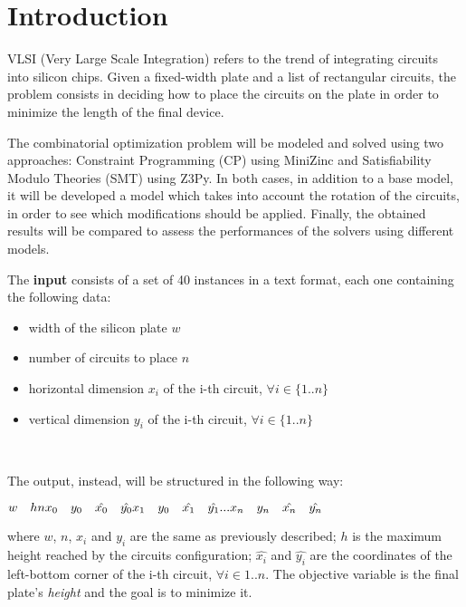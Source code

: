 \section{Introduction}

VLSI (Very Large Scale Integration) refers to the trend of integrating circuits into silicon chips.
Given a fixed-width plate and a list of rectangular circuits, the problem consists in deciding how to place the circuits on the plate in order to minimize the length of the final device. 

The combinatorial optimization problem will be modeled and solved using two approaches: Constraint Programming (CP) using MiniZinc and Satisfiability Modulo Theories (SMT) using Z3Py. In both cases, in addition to a base model, it will be developed a model which takes into account the rotation of the circuits, in order to see which modifications should be applied. Finally, the obtained results will be compared to assess the performances of the solvers using different models.

\hfill

The \textbf{input} consists of a set of 40 instances in a text format, each one containing the following data:
\begin{itemize}
    \item width of the silicon plate $w$
    \item number of circuits to place $n$
    \item horizontal dimension $x_i$ of the i-th circuit, $\forall i \in \{1..n\}$
    \item vertical dimension $y_i$ of the i-th circuit, $\forall i \in \{1..n\}$
\end{itemize}\

The output, instead, will be structured in the following way:

$ w \quad h \\
n \\
x_0\quad y_0\quad \hat{x_0}\quad \hat{y_0} \\
x_1\quad y_0\quad \hat{x_1}\quad \hat{y_1} \\
. . . \\
x_n\quad y_n\quad \hat{x_n}\quad \hat{y_n} \\
$

where $w$, $n$, $x_i$ and $y_i$ are the same as previously described; $h$ is the maximum height reached by the circuits configuration; $\hat{x_i}$ and $\hat{y_i}$ are the coordinates of the left-bottom corner of the i-th circuit, $\forall i \in {1..n}$. The objective variable is the final plate's \textit{height} and the goal is to minimize it.

